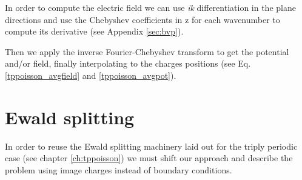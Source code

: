\documentclass[ twoside,openright,titlepage,numbers=noenddot,%
headinclude,footinclude,cleardoublepage=empty,abstract=on,
BCOR=5mm,paper=b5,fontsize=11pt, dvipsnames
]{scrreprt}
\begin{document}
In order to compute the electric field we can use \emph{ik} differentiation in the plane directions and use the Chebyshev coefficients in z for each wavenumber to compute its derivative (see Appendix \ref{sec:bvp}).

Then we apply the inverse Fourier-Chebyshev transform to get the potential and/or field, finally interpolating to the charges positions (see Eq. \eqref{tppoisson_avgfield} and \eqref{tppoisson_avgpot}).


\section{Ewald splitting}\label{sec:dpewald}
In order to reuse the Ewald splitting machinery laid out for the triply periodic case (see chapter \ref{ch:tppoisson}) we must shift our approach and describe the problem using image charges instead of boundary conditions.
\end{document}
